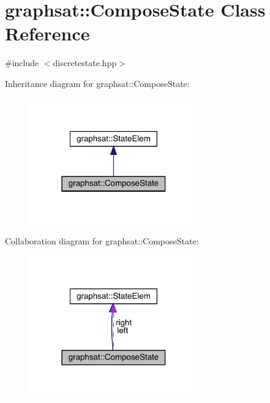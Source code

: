 \hypertarget{classgraphsat_1_1_compose_state}{}\section{graphsat\+::Compose\+State Class Reference}
\label{classgraphsat_1_1_compose_state}


{\ttfamily \#include $<$discretestate.\+hpp$>$}



Inheritance diagram for graphsat\+::Compose\+State\+:\nopagebreak
\begin{figure}[H]
\begin{center}
\leavevmode
\includegraphics[width=207pt]{classgraphsat_1_1_compose_state__inherit__graph}
\end{center}
\end{figure}


Collaboration diagram for graphsat\+::Compose\+State\+:\nopagebreak
\begin{figure}[H]
\begin{center}
\leavevmode
\includegraphics[width=207pt]{classgraphsat_1_1_compose_state__coll__graph}
\end{center}
\end{figure}
